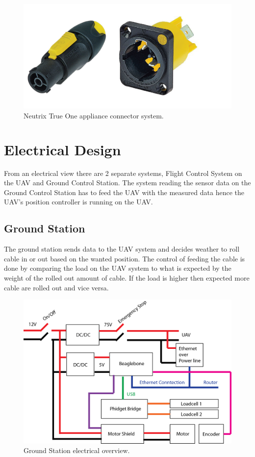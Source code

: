 \begin{figure}[hbtp]
\centering
\includegraphics[scale=1]{graphics/Neutrix-True-One.png}
\caption{Neutrix True One appliance connector system.}
\end{figure}



\section{Electrical Design}
From an electrical view there are 2 separate systems, Flight Control System on the UAV and Ground Control Station. The system reading the sensor data on the Ground Control Station has to feed the UAV with the measured data hence the UAV's position controller is running on the UAV. 


\subsection{Ground Station}
The ground station sends data to the UAV system and decides weather to roll cable in or out based on the wanted position. The control of feeding the cable is done by comparing the load on the UAV system to what is expected by the weight of the rolled out amount of cable. If the load is higher then expected more cable are rolled out and vice versa.  
\begin{figure}[hbtp]
\centering
\includegraphics[scale=0.75]{graphics/GCS-eltectrical-overview.png}
\caption{Ground Station electrical overview.}
\end{figure}


